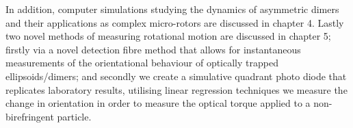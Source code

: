 In addition, computer simulations studying the dynamics of asymmetric dimers 
and their applications as complex micro-rotors are discussed in chapter 4. 
Lastly two novel methods of measuring rotational motion are discussed in 
chapter 5; firstly via a novel detection fibre method that allows for 
instantaneous measurements of the orientational behaviour of optically 
trapped ellipsoids/dimers; and secondly we create a simulative quadrant 
photo diode that replicates laboratory results, utilising linear regression 
techniques we measure the change in orientation in order to measure the 
optical torque applied to a non-birefringent particle. 
